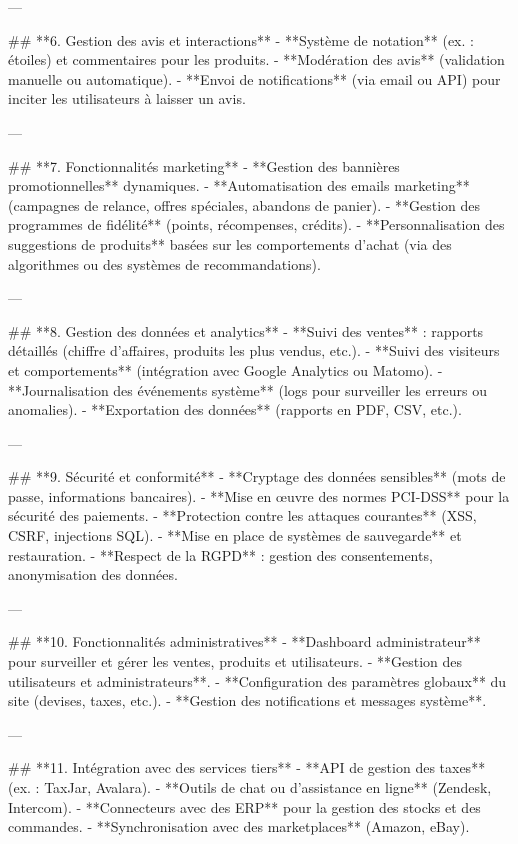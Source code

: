---

## **6. Gestion des avis et interactions**
- **Système de notation** (ex. : étoiles) et commentaires pour les produits.
- **Modération des avis** (validation manuelle ou automatique).
- **Envoi de notifications** (via email ou API) pour inciter les utilisateurs à laisser un avis.

---

## **7. Fonctionnalités marketing**
- **Gestion des bannières promotionnelles** dynamiques.
- **Automatisation des emails marketing** (campagnes de relance, offres spéciales, abandons de panier).
- **Gestion des programmes de fidélité** (points, récompenses, crédits).
- **Personnalisation des suggestions de produits** basées sur les comportements d’achat (via des algorithmes ou des systèmes de recommandations).

---

## **8. Gestion des données et analytics**
- **Suivi des ventes** : rapports détaillés (chiffre d'affaires, produits les plus vendus, etc.).
- **Suivi des visiteurs et comportements** (intégration avec Google Analytics ou Matomo).
- **Journalisation des événements système** (logs pour surveiller les erreurs ou anomalies).
- **Exportation des données** (rapports en PDF, CSV, etc.).

---

## **9. Sécurité et conformité**
- **Cryptage des données sensibles** (mots de passe, informations bancaires).
- **Mise en œuvre des normes PCI-DSS** pour la sécurité des paiements.
- **Protection contre les attaques courantes** (XSS, CSRF, injections SQL).
- **Mise en place de systèmes de sauvegarde** et restauration.
- **Respect de la RGPD** : gestion des consentements, anonymisation des données.

---

## **10. Fonctionnalités administratives**
- **Dashboard administrateur** pour surveiller et gérer les ventes, produits et utilisateurs.
- **Gestion des utilisateurs et administrateurs**.
- **Configuration des paramètres globaux** du site (devises, taxes, etc.).
- **Gestion des notifications et messages système**.

---

## **11. Intégration avec des services tiers**
- **API de gestion des taxes** (ex. : TaxJar, Avalara).
- **Outils de chat ou d’assistance en ligne** (Zendesk, Intercom).
- **Connecteurs avec des ERP** pour la gestion des stocks et des commandes.
- **Synchronisation avec des marketplaces** (Amazon, eBay).

